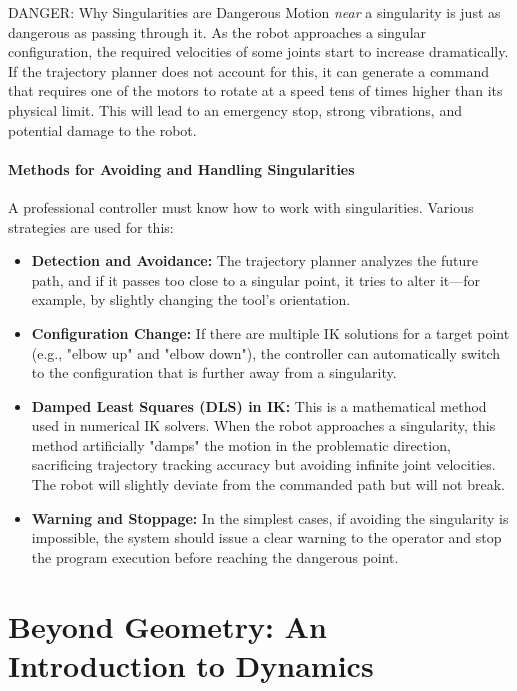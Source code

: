 \begin{dangerbox}{DANGER: Why Singularities are Dangerous}
Motion \textit{near} a singularity is just as dangerous as passing through it. As the robot approaches a singular configuration, the required velocities of some joints start to increase dramatically. If the trajectory planner does not account for this, it can generate a command that requires one of the motors to rotate at a speed tens of times higher than its physical limit. This will lead to an emergency stop, strong vibrations, and potential damage to the robot.
\end{dangerbox}

\paragraph{Methods for Avoiding and Handling Singularities}
A professional controller must know how to work with singularities. Various strategies are used for this:
\begin{itemize}
    \item \textbf{Detection and Avoidance:} The trajectory planner analyzes the future path, and if it passes too close to a singular point, it tries to alter it—for example, by slightly changing the tool's orientation.
    \item \textbf{Configuration Change:} If there are multiple IK solutions for a target point (e.g., "elbow up" and "elbow down"), the controller can automatically switch to the configuration that is further away from a singularity.
    \item \textbf{Damped Least Squares (DLS) in IK:} This is a mathematical method used in numerical IK solvers. When the robot approaches a singularity, this method artificially "damps" the motion in the problematic direction, sacrificing trajectory tracking accuracy but avoiding infinite joint velocities. The robot will slightly deviate from the commanded path but will not break.
    \item \textbf{Warning and Stoppage:} In the simplest cases, if avoiding the singularity is impossible, the system should issue a clear warning to the operator and stop the program execution before reaching the dangerous point.
\end{itemize}



\section{Beyond Geometry: An Introduction to Dynamics}
\label{sec:dynamics}

